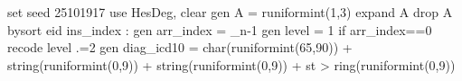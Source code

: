 set seed 25101917
use HesDeg, clear
gen A = runiformint(1,3)
expand A
drop A
bysort eid ins_index : gen arr_index = _n-1
gen level = 1 if arr_index==0
recode level .=2
gen diag_icd10 = char(runiformint(65,90)) + string(runiformint(0,9)) + string(runiformint(0,9)) + st
> ring(runiformint(0,9))

